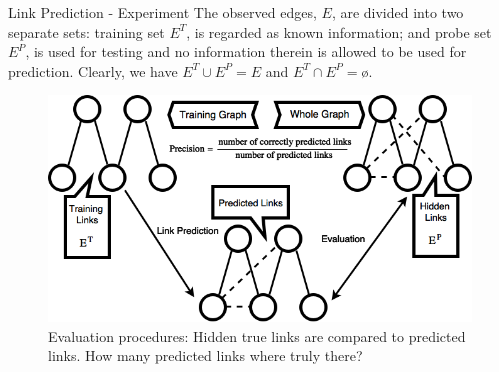 \documentclass[9pt]{beamer}
\begin{document}
\begin{frame}{Link Prediction - Experiment}
The observed edges, $E$, are divided into two separate sets: training set $E^T$, is regarded as known information; and probe set $E^P$, is used for testing and no information therein is allowed to be used for prediction. Clearly, we have $E^T \cup E^P = E$ and $E^T \cap E^P = $\o.

\begin{figure}
\centering
\includegraphics[scale = 0.4]{evaluation.png}
\caption{Evaluation procedures: Hidden true links are compared to predicted links. How many predicted links where truly there?}
\label{example}
\end{figure}
\end{frame}
\end{document}
